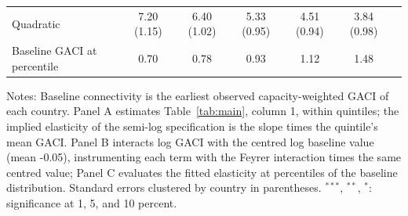 \documentclass[12pt]{article}
\begin{document}
\begin{table}[H]
{\begin{threeparttable}
\begin{tabular}{lcccccc}
  Quadratic & 7.20 (1.15) & 6.40 (1.02) & 5.33 (0.95) & 4.51 (0.94) & 3.84 (0.98) & \\
  Baseline GACI at percentile & 0.70 & 0.78 & 0.93 & 1.12 & 1.48 & \\
\bottomrule
\end{tabular}
\begin{tablenotes}[flushleft]
\footnotesize
\item Notes: Baseline connectivity is the earliest observed capacity-weighted GACI of each country. Panel A estimates Table~\ref{tab:main}, column 1, within quintiles; the implied elasticity of the semi-log specification is the slope times the quintile's mean GACI. Panel B interacts log GACI with the centred log baseline value (mean -0.05), instrumenting each term with the Feyrer interaction times the same centred value; Panel C evaluates the fitted elasticity at percentiles of the baseline distribution. Standard errors clustered by country in parentheses. $^{***}$, $^{**}$, $^{*}$: significance at 1, 5, and 10 percent.
\end{tablenotes}
\end{threeparttable}}
\end{table}
\end{document}
